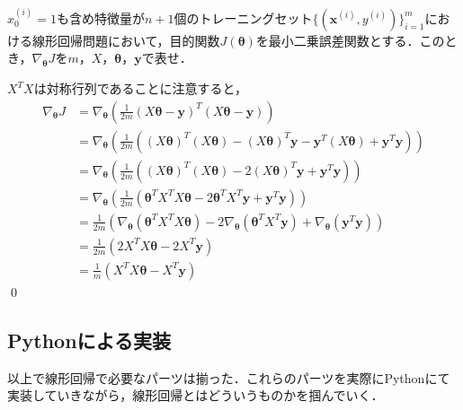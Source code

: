 \begin{qu}
$x_0^{(i)}=1$も含め特徴量が$n+1$個のトレーニングセット$\{({\bm x}^{(i)},y^{(i)})\}_{i=1}^m$における線形回帰問題において，目的関数$J({\bm \theta})$を最小二乗誤差関数とする．このとき，$\nabla_{{\bm \theta}}J$を$m$，$X$，${\bm \theta}$，${\bm y}$で表せ．
\end{qu}
\begin{ans}
$X^TX$は対称行列であることに注意すると，
\begin{align}
\nabla_{{\bm \theta}}J&=\nabla_{{\bm \theta}}\left(\frac{1}{2m}(X{\bm \theta}-{\bm y})^T(X{\bm \theta}-{\bm y})\right) \nonumber\\
&=\nabla_{{\bm \theta}}\left(\frac{1}{2m}\left((X{\bm \theta})^T(X{\bm \theta})-(X{\bm \theta})^T{\bm y}-{\bm y}^T(X{\bm \theta})+{\bm y}^T{\bm y}\right)\right)\nonumber\\
&=\nabla_{{\bm \theta}}\left(\frac{1}{2m}\left((X{\bm \theta})^T(X{\bm \theta})-2(X{\bm \theta})^T{\bm y}+{\bm y}^T{\bm y}\right)\right)\nonumber\\
&=\nabla_{{\bm \theta}}\left(\frac{1}{2m}\left( {\bm \theta}^TX^TX{\bm \theta}-2{\bm \theta}^TX^T{\bm y}+{\bm y}^T{\bm y} \right)\right) \nonumber\\
&=\frac{1}{2m}\left(\nabla_{{\bm \theta}}({\bm \theta}^TX^TX{\bm \theta})-2\nabla_{{\bm \theta}}({\bm \theta}^TX^T{\bm y})+\nabla_{{\bm \theta}}({\bm y}^T{\bm y})\right)\nonumber\\
&=\frac{1}{2m}\left(2X^TX{\bm \theta}-2X^T{\bm y}\right)\nonumber \\
&=\frac{1}{m}\left(X^TX{\bm \theta}-X^T{\bm y}\right) \label{LRglad}
\end{align}\qed
\end{ans}

\subsection{Pythonによる実装}

以上で線形回帰で必要なパーツは揃った．これらのパーツを実際にPythonにて実装していきながら，線形回帰とはどういうものかを掴んでいく．

